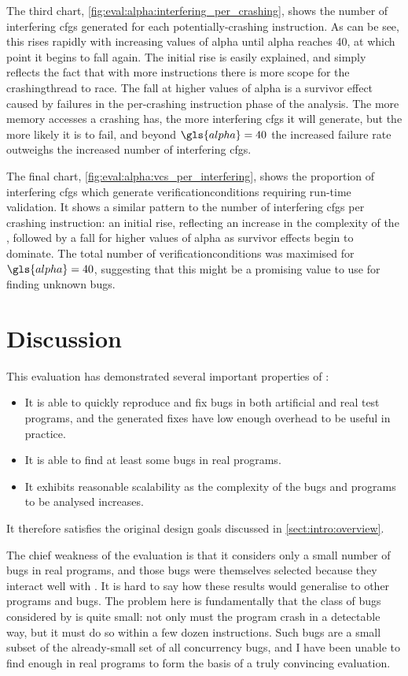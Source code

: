 The third chart, \autoref{fig:eval:alpha:interfering_per_crashing},
shows the number of interfering \glspl{cfg} generated for each
potentially-crashing instruction.  As can be see, this rises rapidly
with increasing values of \gls{alpha} until \gls{alpha} reaches 40, at
which point it begins to fall again.  The initial rise is easily
explained, and simply reflects the fact that with more instructions
there is more scope for the \gls{crashingthread} to race.  The fall at
higher values of \gls{alpha} is a survivor effect caused by failures
in the per-crashing instruction phase of the analysis.  The more
memory accesses a crashing {\StateMachine} has, the more interfering
\glspl{cfg} it will generate, but the more likely it is to fail, and
beyond $\gls{alpha}=40$ the increased failure rate outweighs the
increased number of interfering \glspl{cfg}.

The final chart, \autoref{fig:eval:alpha:vcs_per_interfering}, shows
the proportion of interfering \glspl{cfg} which generate
\glspl{verificationcondition} requiring run-time validation.  It shows
a similar pattern to the number of interfering \glspl{cfg} per
crashing instruction: an initial rise, reflecting an increase in the
complexity of the {\StateMachines}, followed by a fall for higher
values of \gls{alpha} as survivor effects begin to dominate.  The
total number of \glspl{verificationcondition} was maximised for
$\gls{alpha}=40$, suggesting that this might be a promising value to
use for finding unknown bugs.

\section{Discussion}

This evaluation has demonstrated several important properties of
{\technique}:
\begin{itemize}
\item It is able to quickly reproduce and fix bugs in both artificial
  and real test programs, and the generated fixes have low enough
  overhead to be useful in practice.
\item It is able to find at least some bugs in real programs.
\item It exhibits reasonable scalability as the complexity of the
  bugs and programs to be analysed increases.
\end{itemize}
It therefore satisfies the original design goals discussed in
\autoref{sect:intro:overview}.

The chief weakness of the evaluation is that it considers only a small
number of bugs in real programs, and those bugs were themselves
selected because they interact well with {\technique}.  It is hard to
say how these results would generalise to other programs and bugs.
The problem here is fundamentally that the class of bugs considered by
{\technique} is quite small: not only must the program crash in a
detectable way, but it must do so within a few dozen instructions.
Such bugs are a small subset of the already-small set of all
concurrency bugs, and I have been unable to find enough in real
programs to form the basis of a truly convincing evaluation.

